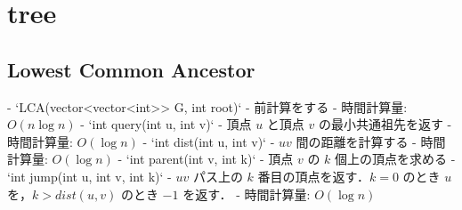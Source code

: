 \section{tree}

\subsection{Lowest Common Ancestor}

\begin{small}
\begin{markdown}
- `LCA(vector<vector<int>> G, int root)`
    - 前計算をする
    - 時間計算量: $O(n\log n)$
- `int query(int u, int v)`
    - 頂点 $u$ と頂点 $v$ の最小共通祖先を返す
    - 時間計算量: $O(\log n)$
- `int dist(int u, int v)`
    - $uv$ 間の距離を計算する
    - 時間計算量: $O(\log n)$
- `int parent(int v, int k)`
    - 頂点 $v$ の $k$ 個上の頂点を求める
- `int jump(int u, int v, int k)`
    - $uv$ パス上の $k$ 番目の頂点を返す．$k=0$ のとき $u$ を，$k>dist(u,v)$ のとき $-1$ を返す．
    - 時間計算量: $O(\log n)$
\end{markdown}
\end{small}

